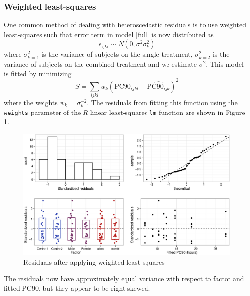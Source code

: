 \subsubsection*{Weighted least-squares}
One common method of dealing with heteroscedastic residuals is to use weighted least-squares such that error term in model \ref{full} is now distributed as 
\begin{equation}
\epsilon_{ijkl}\sim N(0,\sigma^2\sigma_{k}^{2})\label{wls}
\end{equation}
where $\sigma_{k=1}^{2}$ is the variance of subjects on the single treatment, $\sigma_{k=2}^{2}$ is the variance of subjects on the combined treatment and we estimate $\sigma^{2}$. This model is fitted by minimizing
\begin{equation*}
S=\sum_{ijkl} w_{k}(\mathrm{PC}90_{ijkl} - \widehat{\mathrm{PC}90_{ijk}})^{2}
\end{equation*}
where the weights $w_{k}=\sigma_{k}^{-2}$. The residuals from fitting this function using the \texttt{weights} parameter of the \emph{R} linear least-squares \texttt{lm} function are shown in Figure \ref{aovresw}.
\begin{figure}[p]
\includegraphics[width=6.5in]{aovresw.eps} 
\caption{Residuals after applying weighted least squares}
\label{aovresw}
\end{figure}
The residuals now have approximately equal variance with respect to factor and fitted PC90, but they appear to be right-skewed.

